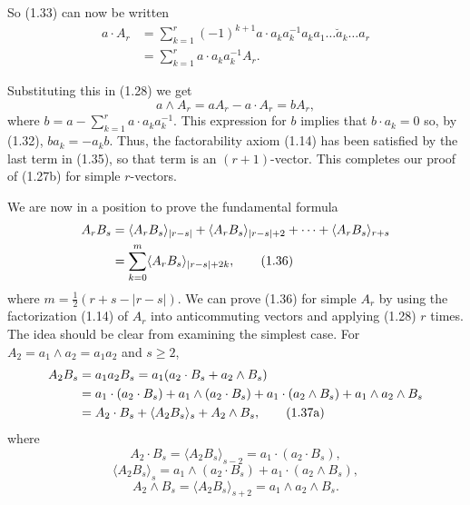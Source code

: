 \documentclass[fleqn]{scrartcl}
\numberwithin{equation}{section}
\begin{document}
\noindent So (1.33) can now be written
\begin{align*}
a \cdot A_r &= \sum_{k=1}^r (-1)^{k+1} a \cdot a_k a_k^{-1} a_k a_1 \dots \breve{a}_k \dots a_r \\
&= \sum_{k=1}^r a \cdot a_k a_k^{-1} A_r.
\end{align*}

\noindent Substituting this in (1.28) we get
\begin{equation}
a \wedge A_r = a A_r - a \cdot A_r = b A_r, \tag{1.35}
\end{equation}
where \(b = a - \sum_{k=1}^r a \cdot a_k a_k^{-1}\). This expression for \(b\) implies that \(b \cdot a_k = 0\) so, by (1.32), \(ba_k = -a_kb\). Thus, the factorability axiom (1.14) has been satisfied by the last term in (1.35), so that term is an \((r+1)\)-vector. This completes our proof of (1.27b) for simple \(r\)-vectors.

\vspace{1em}
\noindent We are now in a position to prove the fundamental formula
\begin{align}
A_r B_s &= \langle A_r B_s \rangle_{|r-s|} + \langle A_r B_s \rangle_{|r-s|+2} + \dots + \langle A_r B_s \rangle_{r+s} \notag \\
&= \sum_{k=0}^m \langle A_r B_s \rangle_{|r-s|+2k}, \tag{1.36}
\end{align}
where \(m = \frac{1}{2}(r+s-|r-s|)\). We can prove (1.36) for simple \(A_r\) by using the factorization (1.14) of \(A_r\) into anticommuting vectors and applying (1.28) \(r\) times. The idea should be clear from examining the simplest case. For \(A_2 = a_1 \wedge a_2 = a_1 a_2\) and \(s \ge 2\),
\begin{align}
A_2 B_s &= a_1 a_2 B_s = a_1 (a_2 \cdot B_s + a_2 \wedge B_s) \notag \\
&= a_1 \cdot (a_2 \cdot B_s) + a_1 \wedge (a_2 \cdot B_s) + a_1 \cdot (a_2 \wedge B_s) + a_1 \wedge a_2 \wedge B_s \notag \\
&= A_2 \cdot B_s + \langle A_2 B_s \rangle_s + A_2 \wedge B_s, \tag{1.37a}
\end{align}
where
\begin{equation}
A_2 \cdot B_s = \langle A_2 B_s \rangle_{s-2} = a_1 \cdot (a_2 \cdot B_s), \tag{1.37b}
\end{equation}
\begin{equation}
\langle A_2 B_s \rangle_s = a_1 \wedge (a_2 \cdot B_s) + a_1 \cdot (a_2 \wedge B_s), \tag{1.37c}
\end{equation}
\begin{equation}
A_2 \wedge B_s = \langle A_2 B_s \rangle_{s+2} = a_1 \wedge a_2 \wedge B_s. \tag{1.37d}
\end{equation}
\end{document}
